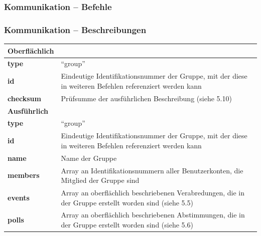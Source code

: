 \documentclass[aspectratio=1610]{beamer}
\begin{document}
    \begin{frame}[plain]
        \frametitle{\textbf{Kommunikation} -- Befehle}
	\end{frame}

    \begin{frame}[plain]
        \frametitle{\textbf{Kommunikation} -- Beschreibungen}
            \begin{tabular}[t]{ p{} p{} }
                \textbf{Oberflächlich}\\
                \hline
                \hfill\textbf{type} & \enquote{group}\\
                \hfill\textbf{id} & Eindeutige Identifikationsnummer der Gruppe{,} mit der diese in
                weiteren Befehlen referenziert werden kann\\
                \hfill\textbf{checksum} & Prüfsumme der ausführlichen
                Beschreibung (siehe 5.10)\\
                \hline\hline
                \textbf{Ausführlich}\\
                \hline
                \hfill\textbf{type} & \enquote{group}\\
                \hfill\textbf{id} & Eindeutige Identifikationsnummer der Gruppe{,} mit der diese in
            weiteren Befehlen referenziert werden kann\\
                \hfill\textbf{name} & Name der Gruppe\\
                \hfill\textbf{members} & Array an
                Identifikationsnummern aller Benutzerkonten, die Mitglied der
                Gruppe sind\\
                \hfill\textbf{events} & Array an oberflächlich
                beschriebenen Verabredungen, die in der Gruppe erstellt worden
                sind (siehe 5.5)\\
                \hfill\textbf{polls} & Array an oberflächlich
                beschriebenen Abstimmungen, die in der Gruppe erstellt worden
                sind (siehe 5.6)\\
            \end{tabular}
	\end{frame}
\end{document}
